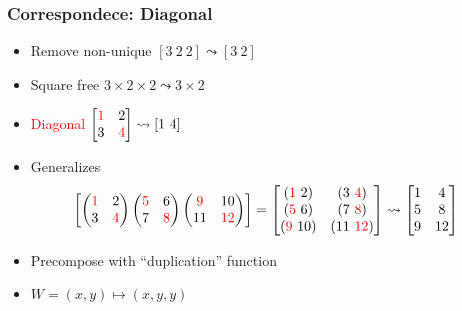 \documentclass[xetex,mathserif,serif]{beamer}
\newcommand\NB[1]{\textcolor{red}{#1}}
\begin{document}
\begin{frame}
  \frametitle{Correspondece: Diagonal}
  \pause
  \begin{itemize}[<+->]
    \item Remove non-unique \([3\ 2\ 2] \leadsto [3\ 2]\)
    \item Square free \(3\times 2\times 2\leadsto 3 \times 2\)
    \item \NB{Diagonal} \(
      \begin{bmatrix}
        \NB 1 & 2 \\
        3 & \NB 4
      \end{bmatrix} \leadsto [1\ 4]
      \)
    \item Generalizes \[
      \!\!\!\!
      \begin{bmatrix}
        \begin{pmatrix}
          \NB 1 & 2 \\ 3 &\NB  4
        \end{pmatrix}
        \begin{pmatrix}
          \NB 5 & 6 \\ 7 & \NB 8
        \end{pmatrix}
        \begin{pmatrix}
          \NB 9 & 10 \\ 11 & \NB{12}
        \end{pmatrix}
      \end{bmatrix} = 
      \begin{bmatrix}
        (\NB 1\ 2) & (3\ \NB 4) \\
        (\NB 5\ 6) & (7\ \NB 8) \\
        (\NB 9\ 10) & (11\ \NB{12})
      \end{bmatrix} \leadsto
      \begin{bmatrix}
        1 & 4 \\
        5 & 8 \\
        9 & 12 
      \end{bmatrix}
      \]
    \item Precompose with ``duplication'' function
    \item \(W = (x, y) \mapsto (x, y, y)\)
  \end{itemize}
\end{frame}
\end{document}
